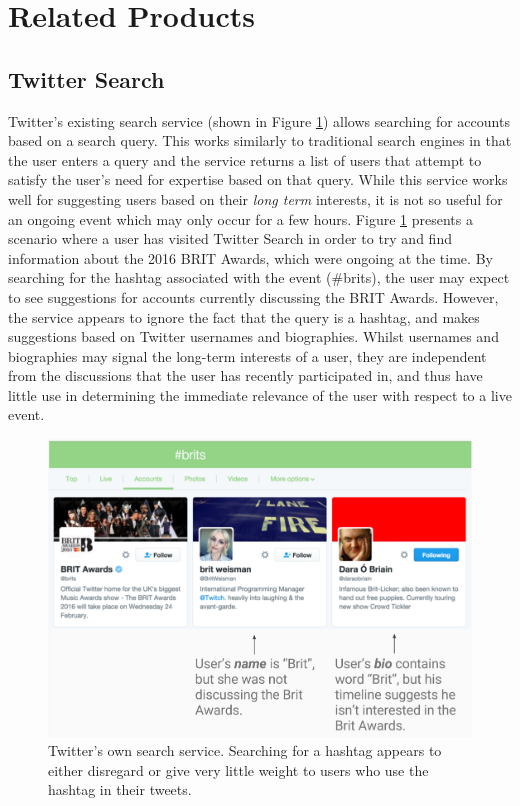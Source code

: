 \documentclass{l4proj}
\begin{document}
\section{Related Products}

\subsection{Twitter Search}
Twitter's existing search service (shown in Figure \ref{twittersearch}) allows searching for accounts based on a search query. This works similarly to traditional search engines in that the user enters a query and the service returns a list of users that attempt to satisfy the user's need for expertise based on that query. While this service works well for suggesting users based on their \textit{long term} interests, it is not so useful for an ongoing event which may only occur for a few hours. Figure \ref{twittersearch} presents a scenario where a user has visited Twitter Search in order to try and find information about the 2016 BRIT Awards, which were ongoing at the time. By searching for the hashtag associated with the event (\#brits), the user may expect to see suggestions for accounts currently discussing the BRIT Awards. However, the service appears to ignore the fact that the query is a hashtag, and makes suggestions based on Twitter usernames and biographies. Whilst usernames and biographies may signal the long-term interests of a user, they are independent from the discussions that the user has recently participated in, and thus have little use in determining the immediate relevance of the user with respect to a live event.

\begin{figure}[H]
\centering
\includegraphics[scale=0.45]{twittersearch.png}
\caption{Twitter's own search service. Searching for a hashtag appears to either disregard or give very little weight to users who use the hashtag in their tweets.}
\label{twittersearch}
\end{figure}
\end{document}
